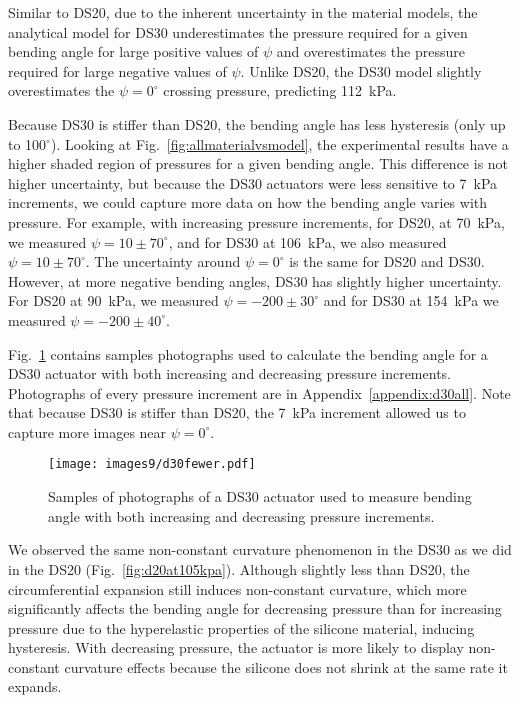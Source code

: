 Similar to DS20, due to the inherent uncertainty in the material models, the analytical model for DS30 underestimates the pressure required for a given bending angle for large positive values of $\psi$ and overestimates the pressure required for large negative values of $\psi$. Unlike DS20, the DS30 model slightly overestimates the $\psi=0^\circ$ crossing pressure, predicting 112~kPa. 

Because DS30 is stiffer than DS20, the bending angle has less hysteresis (only up to 100$^\circ$). Looking at Fig.~\ref{fig:allmaterialvsmodel}, the experimental results have a higher shaded region of pressures for a given bending angle. This difference is not higher uncertainty, but because the DS30 actuators were less sensitive to 7~kPa increments, we could capture more data on how the bending angle varies with pressure. For example, with increasing pressure increments, for DS20, at 70~kPa, we measured $\psi=10\pm70^\circ$, and for DS30 at 106~kPa, we also measured $\psi=10\pm70^\circ$. The uncertainty around $\psi=0^\circ$ is the same for DS20 and DS30. However, at more negative bending angles, DS30 has slightly higher uncertainty. For DS20 at 90~kPa, we measured $\psi=-200\pm30^\circ$ and for DS30 at 154~kPa we measured $\psi=-200\pm40^\circ$. 

\clearpage
Fig.~\ref{fig:d30fewer} contains samples photographs used to calculate the bending angle for a DS30 actuator with both increasing and decreasing pressure increments. Photographs of every pressure increment are in Appendix~\ref{appendix:d30all}. Note that because DS30 is stiffer than DS20, the 7~kPa increment allowed us to capture more images near $\psi=0^\circ$. 

\begin{figure}[!ht]
    \centering
     \texttt{[image: images9/d30fewer.pdf]}
    \caption{Samples of photographs of a DS30 actuator used to measure bending angle with both increasing and decreasing pressure increments.}
    \label{fig:d30fewer}
\end{figure}

We observed the same non-constant curvature phenomenon in the DS30 as we did in the DS20 (Fig.~\ref{fig:d20at105kpa}). Although slightly less than DS20, the circumferential expansion still induces non-constant curvature, which more significantly affects the bending angle for decreasing pressure than for increasing pressure due to the hyperelastic properties of the silicone material, inducing hysteresis. With decreasing pressure, the actuator is more likely to display non-constant curvature effects because the silicone does not shrink at the same rate it expands. 

